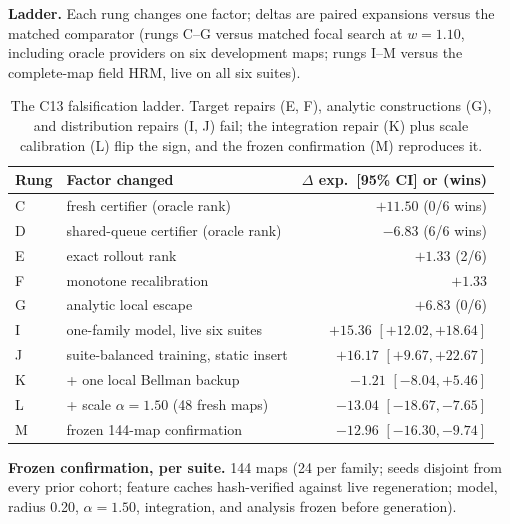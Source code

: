 \documentclass[letterpaper]{article} %
\newcommand{\stage}[1]{\textsc{#1}}
\begin{document}
\textbf{Ladder.} Each rung changes one factor; deltas are paired expansions versus the matched comparator (rungs C--G versus matched focal search at $w{=}1.10$, including oracle providers on six development maps; rungs I--M versus the complete-map field HRM, live on all six suites).

\begin{table}[t]
\centering
\small
\setlength{\tabcolsep}{3pt}
\begin{tabular}{@{}llr@{}}
\toprule
Rung & Factor changed & $\Delta$ exp.\ [95\% CI] or (wins) \\
\midrule
C & fresh certifier (oracle rank) & $+11.50$ (0/6 wins) \\
D & shared-queue certifier (oracle rank) & $-6.83$ (6/6 wins) \\
E & exact rollout rank & $+1.33$ (2/6) \\
F & monotone recalibration & $+1.33$ \\
G & analytic local escape & $+6.83$ (0/6) \\
I & one-family model, live six suites & $+15.36$ $[+12.02,+18.64]$ \\
J & suite-balanced training, static insert & $+16.17$ $[+9.67,+22.67]$ \\
K & + one local Bellman backup & $-1.21$ $[-8.04,+5.46]$ \\
L & + scale $\alpha{=}1.50$ (48 fresh maps) & $-13.04$ $[-18.67,-7.65]$ \\
M & frozen 144-map confirmation & $-12.96$ $[-16.30,-9.74]$ \\
\bottomrule
\end{tabular}
\caption{The \stage{C13} falsification ladder. Target repairs (E, F), analytic constructions (G), and distribution repairs (I, J) fail; the integration repair (K) plus scale calibration (L) flip the sign, and the frozen confirmation (M) reproduces it.}
\label{tab:c13ladder}
\end{table}

\textbf{Frozen confirmation, per suite.} 144 maps (24 per family; seeds disjoint from every prior cohort; feature caches hash-verified against live regeneration; model, radius 0.20, $\alpha{=}1.50$, integration, and analysis frozen before generation).
\end{document}
